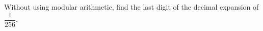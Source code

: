 Without using modular arithmetic, find the last digit of the decimal expansion of $\dfrac{1}{256}$.
